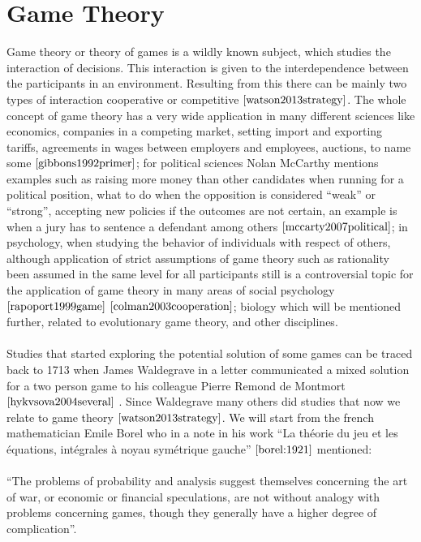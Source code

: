 \section{Game Theory}
\label{Literature:gt}
Game theory or theory of games is a wildly known subject, which studies the interaction of decisions. This interaction is given to the interdependence between the participants in an environment. Resulting from this there can be mainly two types of interaction cooperative or competitive $\cite{watson2013strategy}$. The whole concept of game theory has a very wide application in many different sciences like economics, companies in a competing market, setting import and exporting tariffs, agreements in wages between employers and employees, auctions, to name some $\cite{gibbons1992primer}$; for political sciences Nolan McCarthy mentions examples such as raising more money than other candidates when running for a political position, what to do when the opposition is considered “weak” or “strong”, accepting new policies if the outcomes are not certain,  an example is when a jury has to sentence a defendant among others $\cite{mccarty2007political}$; in psychology, when studying the behavior of individuals with respect of others, although application of strict assumptions of game theory such as rationality been assumed in the same level for all participants still is a controversial topic for the application of game theory in many areas of social psychology $\cite{rapoport1999game}$ $\cite{colman2003cooperation}$; biology which will be mentioned further, related to evolutionary game theory, and other disciplines. 
\\\\Studies that started exploring the potential solution of some games can be traced back to 1713  when James Waldegrave in a letter communicated a mixed solution for a two person game to his colleague Pierre Remond de Montmort $\cite{hykvsova2004several}$ . Since Waldegrave many others did studies that now we relate to game theory $\cite{watson2013strategy}$.  We will start from the french mathematician Emile Borel who in a note in his work ``La th\'{e}orie du jeu et les \'{e}quations, int\'{e}grales \`{a} noyau sym\'{e}trique gauche'' $\cite{borel:1921}$ mentioned:
\\\\ ``The problems of probability and analysis suggest themselves concerning the art of war, or economic or financial speculations, are not without analogy with problems concerning games, though they generally have a higher degree of complication''.

